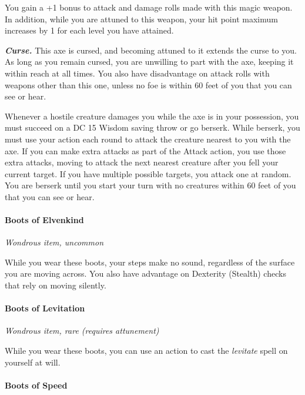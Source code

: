 \documentclass[
]{article}
\begin{document}
You gain a +1 bonus to attack and damage rolls made with this magic
weapon. In addition, while you are attuned to this weapon, your hit
point maximum increases by 1 for each level you have attained.

\emph{\textbf{Curse.}} This axe is cursed, and becoming attuned to it
extends the curse to you. As long as you remain cursed, you are
unwilling to part with the axe, keeping it within reach at all times.
You also have disadvantage on attack rolls with weapons other than this
one, unless no foe is within 60 feet of you that you can see or hear.

Whenever a hostile creature damages you while the axe is in your
possession, you must succeed on a DC 15 Wisdom saving throw or go
berserk. While berserk, you must use your action each round to attack
the creature nearest to you with the axe. If you can make extra attacks
as part of the Attack action, you use those extra attacks, moving to
attack the next nearest creature after you fell your current target. If
you have multiple possible targets, you attack one at random. You are
berserk until you start your turn with no creatures within 60 feet of
you that you can see or hear.

\hypertarget{boots-of-elvenkind}{%
\paragraph{Boots of Elvenkind}\label{boots-of-elvenkind}}

\emph{Wondrous item, uncommon}

While you wear these boots, your steps make no sound, regardless of the
surface you are moving across. You also have advantage on Dexterity
(Stealth) checks that rely on moving silently.

\hypertarget{boots-of-levitation}{%
\paragraph{Boots of Levitation}\label{boots-of-levitation}}

\emph{Wondrous item, rare (requires attunement)}

While you wear these boots, you can use an action to cast the
\emph{levitate} spell on yourself at will.

\hypertarget{boots-of-speed}{%
\paragraph{Boots of Speed}\label{boots-of-speed}}
\end{document}
